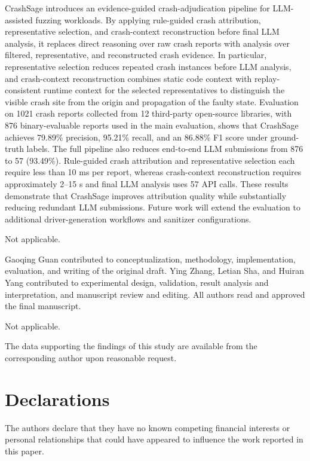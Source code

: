 \documentclass[pdflatex,sn-basic]{sn-jnl}%
\theoremstyle{thmstyleone}%
\theoremstyle{thmstyletwo}%
\theoremstyle{thmstylethree}%
\begin{document}
CrashSage introduces an evidence-guided crash-adjudication pipeline for LLM-assisted fuzzing workloads. By applying rule-guided crash attribution, representative selection, and crash-context reconstruction before final LLM analysis, it replaces direct reasoning over raw crash reports with analysis over filtered, representative, and reconstructed crash evidence. In particular, representative selection reduces repeated crash instances before LLM analysis, and crash-context reconstruction combines static code context with replay-consistent runtime context for the selected representatives to distinguish the visible crash site from the origin and propagation of the faulty state. Evaluation on 1021 crash reports collected from 12 third-party open-source libraries, with 876 binary-evaluable reports used in the main evaluation, shows that CrashSage achieves 79.89\% precision, 95.21\% recall, and an 86.88\% F1 score under ground-truth labels. The full pipeline also reduces end-to-end LLM submissions from 876 to 57 (93.49\%). Rule-guided crash attribution and representative selection each require less than 10 ms per report, whereas crash-context reconstruction requires approximately 2--15 s and final LLM analysis uses 57 API calls. These results demonstrate that CrashSage improves attribution quality while substantially reducing redundant LLM submissions. Future work will extend the evaluation to additional driver-generation workflows and sanitizer configurations.

\backmatter


Not applicable.


Gaoqing Guan contributed to conceptualization, methodology, implementation, evaluation, and writing of the original draft. Ying Zhang, Letian Sha, and Huiran Yang contributed to experimental design, validation, result analysis and interpretation, and manuscript review and editing. All authors read and approved the final manuscript.


Not applicable.


The data supporting the findings of this study are available from the corresponding author upon reasonable request.

\section*{Declarations}


The authors declare that they have no known competing financial interests or personal relationships that could have appeared to influence the work reported in this paper.


\end{document}
